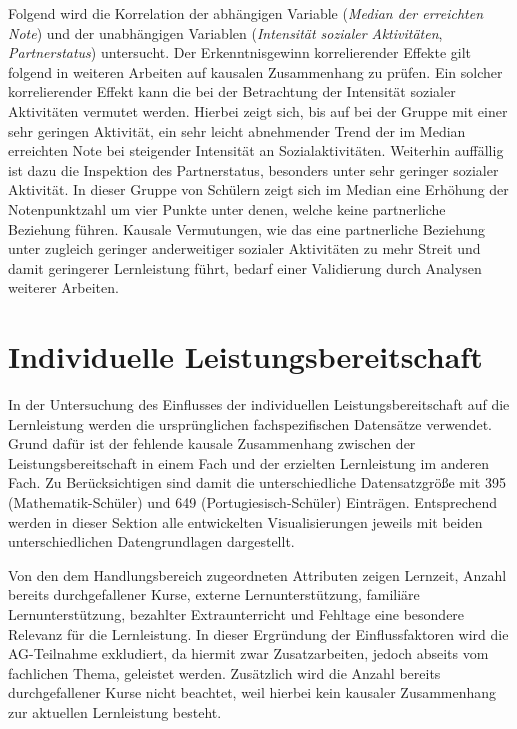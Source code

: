 Folgend wird die Korrelation der abhängigen Variable (\textit{Median der erreichten Note}) und der unabhängigen Variablen (\textit{Intensität sozialer Aktivitäten}, \textit{Partnerstatus}) untersucht.
Der Erkenntnisgewinn korrelierender Effekte gilt folgend in weiteren Arbeiten auf kausalen Zusammenhang zu prüfen.
Ein solcher korrelierender Effekt kann die bei der Betrachtung der Intensität sozialer Aktivitäten vermutet werden. 
Hierbei zeigt sich, bis auf bei der Gruppe mit einer sehr geringen Aktivität, ein sehr leicht abnehmender Trend der im Median erreichten Note bei steigender Intensität an Sozialaktivitäten.
Weiterhin auffällig ist dazu die Inspektion des Partnerstatus, besonders unter sehr geringer sozialer Aktivität.
In dieser Gruppe von Schülern zeigt sich im Median eine Erhöhung der Notenpunktzahl um vier Punkte unter denen, welche keine partnerliche Beziehung führen.
Kausale Vermutungen, wie das eine partnerliche Beziehung unter zugleich geringer anderweitiger sozialer Aktivitäten zu mehr Streit und damit geringerer Lernleistung führt, bedarf einer Validierung durch Analysen weiterer Arbeiten.


\section{Individuelle Leistungsbereitschaft}

In der Untersuchung des Einflusses der individuellen Leistungsbereitschaft auf die Lernleistung werden die ursprünglichen fachspezifischen Datensätze verwendet.
Grund dafür ist der fehlende kausale Zusammenhang zwischen der Leistungsbereitschaft in einem Fach und der erzielten Lernleistung im anderen Fach.
Zu Berücksichtigen sind damit die unterschiedliche Datensatzgröße mit 395 (Mathematik-Schüler) und 649 (Portugiesisch-Schüler) Einträgen.
Entsprechend werden in dieser Sektion alle entwickelten Visualisierungen jeweils mit beiden unterschiedlichen Datengrundlagen dargestellt.

Von den dem Handlungsbereich zugeordneten Attributen zeigen Lernzeit, Anzahl bereits durchgefallener Kurse, externe Lernunterstützung, familiäre Lernunterstützung, bezahlter Extraunterricht und Fehltage eine besondere Relevanz für die Lernleistung. 
In dieser Ergründung der Einflussfaktoren wird die AG-Teilnahme exkludiert, da hiermit zwar Zusatzarbeiten, jedoch abseits vom fachlichen Thema, geleistet werden.
Zusätzlich wird die Anzahl bereits durchgefallener Kurse nicht beachtet, weil hierbei kein kausaler Zusammenhang zur aktuellen Lernleistung besteht.

